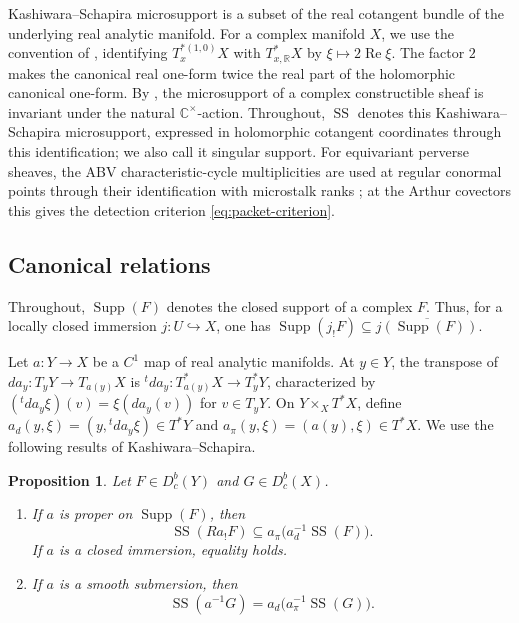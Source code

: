 \documentclass[10pt]{amsart}
\numberwithin{equation}{section}
\theoremstyle{plain}
\newtheorem{proposition}{Proposition}[section]
\theoremstyle{definition}
\theoremstyle{remark}
\newcommand{\CC}{\mathbb C}
\newcommand{\RR}{\mathbb R}
\newcommand{\SSupp}{\operatorname{SS}}
\begin{document}
Kashiwara--Schapira microsupport is a subset of the real cotangent bundle
of the underlying real analytic manifold. For a complex manifold $X$, we
use the convention of \cite[Section~8.5.1]{KS85}, identifying
$T_x^{*(1,0)}X$ with $T^*_{x,\RR}X$ by $\xi\mapsto2\operatorname{Re}\xi$.
The factor $2$ makes the canonical real one-form twice the real part of the
holomorphic canonical one-form. By \cite[Theorem~8.5.2]{KS85}, the
microsupport of a complex constructible sheaf is invariant under the
natural $\CC^\times$-action.
Throughout, $\SSupp$ denotes this Kashiwara--Schapira microsupport,
expressed in holomorphic cotangent coordinates through this
identification; we also call it singular support.
For equivariant perverse sheaves, the ABV characteristic-cycle
multiplicities are used at regular conormal points through their
identification with microstalk ranks
\cite[Theorem~24.8(a)]{ABV92}; at the Arthur covectors this gives
the detection criterion \eqref{eq:packet-criterion}.

\subsection{Canonical relations}

Throughout, $\operatorname{Supp}(F)$ denotes the closed support of a
complex $F$. Thus, for a locally closed immersion
$j:U\hookrightarrow X$, one has
$\operatorname{Supp}(j_!F)\subseteq
\overline{j(\operatorname{Supp}(F))}$.

Let $a:Y\to X$ be a $C^1$ map of real analytic manifolds. At $y\in Y$, the
transpose of $da_y:T_yY\to T_{a(y)}X$ is
${}^tda_y:T^*_{a(y)}X\to T^*_yY$, characterized by
$({}^tda_y\xi)(v)=\xi(da_y(v))$ for $v\in T_yY$. On
$Y\times_XT^*X$, define $a_d(y,\xi)=(y,{}^tda_y\xi)\in T^*Y$ and
$a_\pi(y,\xi)=(a(y),\xi)\in T^*X$.
We use the following results of Kashiwara--Schapira.

\begin{proposition}\label{prop:ks}
Let $F\in D^b_c(Y)$ and $G\in D^b_c(X)$.
\begin{enumerate}[label=\textup{(\roman*)}]
  \item If $a$ is proper on $\operatorname{Supp}(F)$, then
  \begin{equation}\label{eq:proper-ss}
    \SSupp(Ra_!F)
    \subseteq
    a_\pi\bigl(a_d^{-1}\SSupp(F)\bigr).
  \end{equation}
  If $a$ is a closed immersion, equality holds.
  \item If $a$ is a smooth submersion, then
  \begin{equation}\label{eq:smooth-ss}
    \SSupp(a^{-1}G)
    =a_d\bigl(a_\pi^{-1}\SSupp(G)\bigr).
  \end{equation}
\end{enumerate}
\end{proposition}
\end{document}
